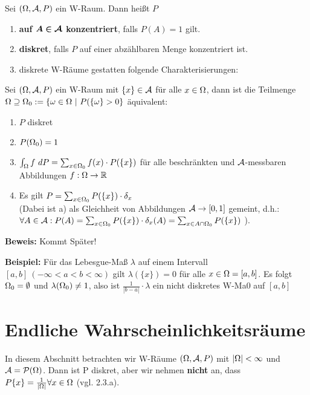 \documentclass[parskip = full, 12pt]{scrartcl}
\begin{document}
\label{ss: Definition 2.4}
	Sei $(\Omega, \mathcal{A}, P)$ ein W-Raum. Dann heißt $P$
	\begin{enumerate}
		\item \textbf{auf $\bm{A \in \mathcal{A}}$ konzentriert}, falls $P(A) = 1$ gilt.
		\item \textbf{diskret}, falls $P$ auf einer abzählbaren Menge konzentriert
			ist.
		\item diskrete W-Räume gestatten folgende Charakterisierungen:
	\end{enumerate}

\label{ss: Satz 2.5} 
	Sei $(\Omega, \mathcal{A}, P)$ ein W-Raum mit $\{ x\} \in \mathcal{A}$ für 
	alle $x \in \Omega$, dann ist die Teilmenge $\Omega \supseteq \Omega_0 := \{ \omega \in
	\Omega\ |\ P(\{ \omega \} > 0\}$ äquivalent:
	\begin{enumerate}
		\item $P$ diskret
		\item $P(\Omega_0) = 1$
		\item ${ \int_{\Omega} f\ dP =  \sum_{x \in \Omega_0} 
			f(x) \cdot P(\{	x\})}$ für alle beschränkten und $\mathcal{A}$-messbaren 
			Abbildungen $f:\Omega \rightarrow \mathbb{R}$
		\item Es gilt $P = \sum_{x \in \Omega_0} P(\{ x\}) \cdot \delta_x$\\
			(Dabei ist a) als Gleichheit von Abbildungen $\mathcal{A} \rightarrow [0, 1]$ 
			gemeint, d.h.: $ \forall A \in \mathcal{A}: P(A) = \sum_{x 
			\in \Omega_0} P(\{ x\}) \cdot \delta_x(A) =  \sum_{x \in A \cap \Omega_0} 
			P(\{ x \})$ ). 
	\end{enumerate}

	\textbf{Beweis:} Kommt Später!

	\textbf{Beispiel:} Für das Lebesgue-Maß $\lambda$ auf einem Intervall $[a,b]\ 
		(-\infty < a < b < \infty)$ gilt $\lambda(\{ x\}) = 0$ für alle $x \in \Omega =
		[a,b]$. Es folgt $\Omega_0 = \emptyset$ und $\lambda(\Omega_0) \neq 1$, also ist 
		$\frac{1}{|b-a|} \cdot \lambda$ ein nicht diskretes W-Ma0 auf $[a,b]$

\section{Endliche Wahrscheinlichkeitsräume}
\label{s: 3. Endliche Wahrscheinlichkeitsraeume}
	In diesem Abschnitt betrachten wir W-Räume $(\Omega, \mathcal{A}, P)$ mit $|\Omega| < \infty
	$ und $\mathcal{A} = \mathcal{P}(\Omega)$. Dann ist P diskret, aber wir nehmen \textbf{nicht}
	an, dass $P\{ x\} = \frac{1}{|\Omega|} \forall x \in \Omega$ (vgl. 2.3.a).
\end{document}
